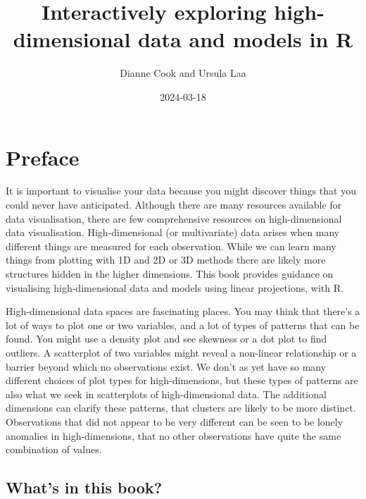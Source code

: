 \documentclass[
  letterpaper,
]{krantz}
\title{Interactively exploring high-dimensional data and models in R}
\author{Dianne Cook and Ursula Laa}
\date{2024-03-18}
\renewcommand*\contentsname{Table of contents}
\newcommand\contentsname{Table of contents}
\begin{document}
\maketitle

\renewcommand*\contentsname{Contents}
{
\hypersetup{linkcolor=}
\setcounter{tocdepth}{1}
\tableofcontents
}

\chapter*{Preface}\label{preface}


It is important to visualise your data because you might discover things
that you could never have anticipated. Although there are many resources
available for data visualisation, there are few comprehensive resources
on high-dimensional data visualisation. High-dimensional (or
multivariate) data arises when many different things are measured for
each observation. While we can learn many things from plotting with 1D
and 2D or 3D methods there are likely more structures hidden in the
higher dimensions. This book provides guidance on visualising
high-dimensional data and models using linear projections, with R.

High-dimensional data spaces are fascinating places. You may think that
there's a lot of ways to plot one or two variables, and a lot of types
of patterns that can be found. You might use a density plot and see
skewness or a dot plot to find outliers. A scatterplot of two variables
might reveal a non-linear relationship or a barrier beyond which no
observations exist. We don't as yet have so many different choices of
plot types for high-dimensions, but these types of patterns are also
what we seek in scatterplots of high-dimensional data. The additional
dimensions can clarify these patterns, that clusters are likely to be
more distinct. Observations that did not appear to be very different can
be seen to be lonely anomalies in high-dimensions, that no other
observations have quite the same combination of values.

\section*{What's in this book?}\label{whats-in-this-book}

\end{document}
